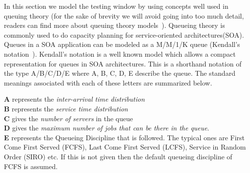  
In this section we model the testing window by using concepts well used in queuing theory (for the sake of brevity we will avoid going into too much detail, readers can find more about queuing theory models~\cite{queueBook}).
Queueing theory is commonly used to do capacity planning for service-oriented architectures(SOA).
Queues in a SOA application can be modeled as a M/M/1/K queue (Kendall's notation~\cite{kendall}).
Kendall's notation is a well known model which allows a compact representation for queues in SOA architectures.
This is a shorthand notation of the type A/B/C/D/E where A, B, C, D, E describe the queue.
The standard meanings associated with each of these letters are summarized below.\\

\begin{framed}
	\noindent \textbf{A} represents the \emph{inter-arrival time distribution}\\
	\textbf{B} represents the \emph{service time distribution}\\
	\textbf{C} gives the \emph{number of servers} in the queue\\
	\textbf{D} gives the \emph{maximum number of jobs that can be there in the queue}.\\
	\textbf{E} represents the Queueing Discipline that is followed. The typical ones are First Come First Served (FCFS), Last Come First Served (LCFS), Service in Random Order (SIRO) etc. If this is not given then the default queueing discipline of FCFS is assumed.
\end{framed}

